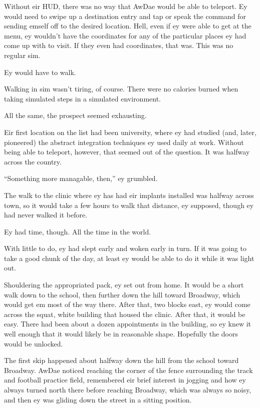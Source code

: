 Without eir HUD, there was no way that AwDae would be able to teleport. Ey would need to swipe up a destination entry and tap or speak the command for sending emself off to the desired location. Hell, even if ey were able to get at the menu, ey wouldn't have the coordinates for any of the particular places ey had come up with to visit. If they even had coordinates, that was. This was no regular sim.

Ey would have to walk.

Walking in sim wasn't tiring, of course. There were no calories burned when taking simulated steps in a simulated environment.

All the same, the prospect seemed exhausting.

Eir first location on the list had been university, where ey had studied (and, later, pioneered) the abstract integration techniques ey used daily at work. Without being able to teleport, however, that seemed out of the question. It was halfway across the country.

``Something more managable, then,'' ey grumbled.

The walk to the clinic where ey has had eir implants installed was halfway across town, so it would take a few hours to walk that distance, ey supposed, though ey had never walked it before.

Ey had time, though. All the time in the world.

With little to do, ey had slept early and woken early in turn. If it was going to take a good chunk of the day, at least ey would be able to do it while it was light out.

Shouldering the appropriated pack, ey set out from home. It would be a short walk down to the school, then further down the hill toward Broadway, which would get em most of the way there. After that, two blocks east, ey would come across the squat, white building that housed the clinic. After that, it would be easy. There had been about a dozen appointments in the building, so ey knew it well enough that it would likely be in reasonable shape. Hopefully the doors would be unlocked.

The first skip happened about halfway down the hill from the school toward Broadway. AwDae noticed reaching the corner of the fence surrounding the track and football practice field, remembered eir brief interest in jogging and how ey always turned north there before reaching Broadway, which was always so noisy, and then ey was gliding down the street in a sitting position.

